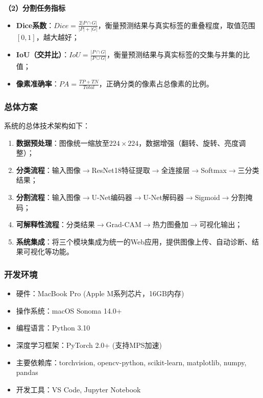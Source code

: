 \documentclass[supercite]{Hust-undergraduate-kaiti}
\theoremstyle{definition}
\begin{document}
\textbf{（2）分割任务指标}

\begin{itemize}
    \item \textbf{Dice系数}：$Dice = \frac{2|P \cap G|}{|P| + |G|}$，衡量预测结果与真实标签的重叠程度，取值范围$[0, 1]$，越大越好；
    \item \textbf{IoU（交并比）}：$IoU = \frac{|P \cap G|}{|P \cup G|}$，衡量预测结果与真实标签的交集与并集的比值；
    \item \textbf{像素准确率}：$PA = \frac{TP + TN}{Total}$，正确分类的像素占总像素的比例。
\end{itemize}

\subsubsection{总体方案}

系统的总体技术架构如下：

\begin{enumerate}
    \item \textbf{数据预处理}：图像统一缩放至$224\times224$，数据增强（翻转、旋转、亮度调整）；
    \item \textbf{分类流程}：输入图像$\rightarrow$ResNet18特征提取$\rightarrow$全连接层$\rightarrow$Softmax$\rightarrow$三分类结果；
    \item \textbf{分割流程}：输入图像$\rightarrow$U-Net编码器$\rightarrow$U-Net解码器$\rightarrow$Sigmoid$\rightarrow$分割掩码；
    \item \textbf{可解释性流程}：分类结果$\rightarrow$Grad-CAM$\rightarrow$热力图叠加$\rightarrow$可视化输出；
    \item \textbf{系统集成}：将三个模块集成为统一的Web应用，提供图像上传、自动诊断、结果可视化等功能。
\end{enumerate}

\subsubsection{开发环境}

\begin{itemize}
    \item 硬件：MacBook Pro (Apple M系列芯片，16GB内存)
    \item 操作系统：macOS Sonoma 14.0+
    \item 编程语言：Python 3.10
    \item 深度学习框架：PyTorch 2.0+ (支持MPS加速)
    \item 主要依赖库：torchvision, opencv-python, scikit-learn, matplotlib, numpy, pandas
    \item 开发工具：VS Code, Jupyter Notebook
\end{itemize}
\end{document}
